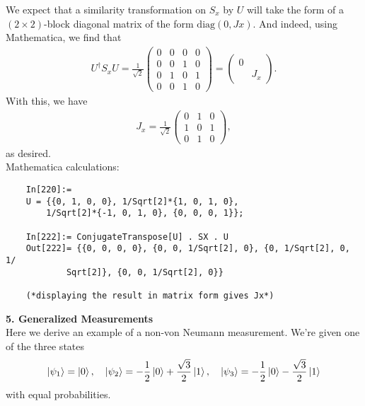 \documentclass{article}
\theoremstyle{definition}
\newcommand{\f}[2]{\frac{#1}{#2}}
\begin{document}
We expect that a similarity transformation on $S_x$ by $U$ will take the form of a $(2\times 2)$-block diagonal matrix of the form $\text{diag}(0,Jx)$. And indeed, using Mathematica, we find that
\begin{align*}
	U^\dagger S_x U = \f{1}{\sqrt{2}}\begin{pmatrix}
		0&0&0&0\\
		0&0&1&0\\
		0&1&0&1\\
		0&0&1&0
	\end{pmatrix} = \begin{pmatrix}
	0 & \\
	& J_x
\end{pmatrix}.
\end{align*}
With this, we have
\begin{align*}
		J_x = \f{1}{\sqrt{2}}\begin{pmatrix}
		0 &1 &0 \\ 
		1 &0 &1 \\
		0 &1 &0 
	\end{pmatrix}, 
\end{align*}
as desired. \\


Mathematica calculations:
\begin{lstlisting}
	In[220]:= 
	U = {{0, 1, 0, 0}, 1/Sqrt[2]*{1, 0, 1, 0}, 
		1/Sqrt[2]*{-1, 0, 1, 0}, {0, 0, 0, 1}};
	
	In[222]:= ConjugateTranspose[U] . SX . U
	Out[222]= {{0, 0, 0, 0}, {0, 0, 1/Sqrt[2], 0}, {0, 1/Sqrt[2], 0, 1/
			Sqrt[2]}, {0, 0, 1/Sqrt[2], 0}}
		
	(*displaying the result in matrix form gives Jx*)
\end{lstlisting}


\noindent \textbf{5. Generalized Measurements}\\


\noindent Here we derive an example of a non-von Neumann measurement. We're given one of the three states
\begin{align*}
	\ket{\psi_1} = \ket{0} , \quad \ket{\psi_2} = -\f{1}{2} \ket{0} + \f{\sqrt{3}}{2}\ket{1}, \quad \ket{\psi_3} = -\f{1}{2}\ket{0} - \f{\sqrt{3}}{2}\ket{1}
\end{align*}
with equal probabilities. 
\end{document}

